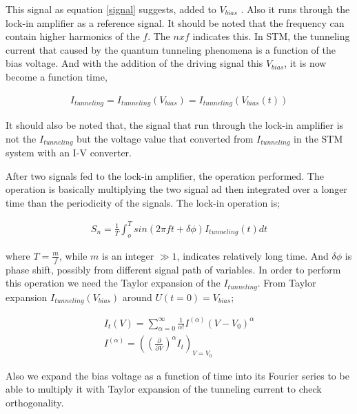 \documentclass[10pt,a4paper,notitlepage]{article}
\begin{document}
This signal as equation \ref{signal} suggests, added to $V_{bias}$ . Also it runs through the
lock-in amplifier as a reference signal. It should be noted that the frequency can
contain higher harmonics of the $f$. The $nxf$ indicates this.
In STM, the tunneling current that caused by the quantum tunneling
phenomena is a function of the bias voltage. And with the addition of the driving
signal this $V_{bias}$, it is now become a function time,

\begin{equation}
\label{itunnel}
\begin{split}
I_{tunneling}=I_{tunneling}(V_{bias})=I_{tunneling}(V_{bias}(t))
\end{split}
\end{equation}

It should also be noted that, the signal that run through the lock-in amplifier is
not the $I_{tunneling}$ but the voltage value that converted from $I_{tunneling}$ in the STM
system with an I-V converter.

After two signals fed to the lock-in amplifier, the operation performed. The
operation is basically multiplying the two signal ad then integrated over a longer time
than the periodicity of the signals. The lock-in operation is;

\begin{equation}
\label{liop}
\begin{split}
S_n=\frac{1}{T}\int_{o}^{T} sin(2 \pi ft+\delta \phi)I_{tunneling}(t)dt
\end{split}
\end{equation}

where $T=\frac{m}{f}$, while $m$ is an integer $\gg 1$, indicates relatively long time. And $\delta \phi$ is
phase shift, possibly from different signal path of variables.
In order to perform this operation we need the Taylor expansion of the
$I_{tunneling}$. From Taylor expansion $I_{tunneling}(V_{bias})$ around $U(t=0)=V_{bias}$;

\begin{equation}
\label{}
\begin{split}
I_t(V)=\sum_{\alpha=0}^{\infty}\frac{1}{\alpha!}I^{(\alpha)}(V-V_0)^\alpha \\
I^{(\alpha)}=\left(\left(\frac{\partial}{\partial V}\right)^\alpha I_t\right)_{V=V_0}
\end{split}
\end{equation}

Also we expand the bias voltage as a function of time into its Fourier series to
be able to multiply it with Taylor expansion of the tunneling current to check
orthogonality.
\end{document}
